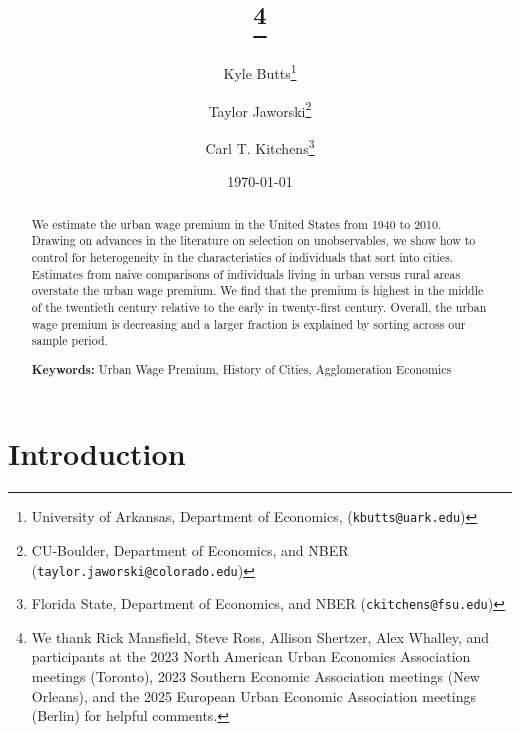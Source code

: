 \documentclass[12pt]{article}
\makeatletter
\def\emailkyle{\tt{\color{blue}kbutts@uark.edu}}
\def\emailtaylor{\tt{\color{blue}taylor.jaworski@colorado.edu}}
\def\emailcarl{\tt{\color{blue}ckitchens@fsu.edu}}
\makeatother
\begin{document}
  
\begin{titlepage}

\title{\thanks{We thank Rick Mansfield, Steve Ross, Allison Shertzer, Alex Whalley, and participants at the 2023 North American Urban Economics Association meetings (Toronto), 2023 Southern Economic Association meetings (New Orleans), and the 2025 European Urban Economic Association meetings (Berlin) for helpful comments.}}
\author{%
  \large Kyle Butts\thanks{University of Arkansas, Department of Economics, ({\emailkyle})}
  \and
  \large Taylor Jaworski\thanks{CU-Boulder, Department of Economics, and NBER ({\emailtaylor})}  
  \and
  \large Carl T.
  Kitchens\thanks{Florida State, Department of Economics, and NBER ({\emailcarl})}  
}
\date{\large \today}

\maketitle

\begin{singlespacing}
\begin{abstract}\noindent
We estimate the urban wage premium in the United States from 1940 to 2010. Drawing on advances in the literature on selection on unobservables, we show how to control for heterogeneity in the characteristics of individuals that sort into cities. Estimates from naive comparisons of individuals living in urban versus rural areas overstate the urban wage premium. We find that the premium is highest in the middle of the twentieth century relative to the early in twenty-first century. Overall, the urban wage premium is decreasing and a larger fraction is explained by sorting across our sample period.

\vspace{1em}
\noindent
\textbf{Keywords:} Urban Wage Premium, History of Cities, Agglomeration Economics
\end{abstract}
\end{singlespacing}

\thispagestyle{empty}

\end{titlepage}


\section{Introduction}
\end{document}
